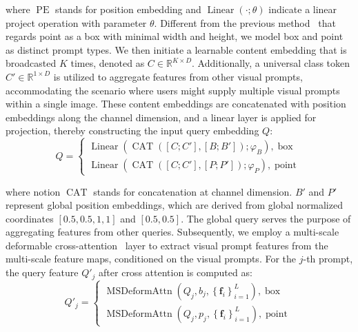 where $\operatorname{PE}$ stands for position embedding and $\operatorname{Linear}(\cdot; \theta)$ indicate a linear project operation with parameter $\theta$. Different from the previous method~\cite{li2023semantic} that regards point as a box with minimal width and height, we model box and point as distinct prompt types. We then initiate a learnable content embedding that is broadcasted $K$ times, denoted as $C \in \mathbb{R}^{K \times D}$. Additionally, a universal class token $C' \in \mathbb{R}^{1 \times D}$ is utilized to aggregate features from other visual prompts, accommodating the scenario where users might supply multiple visual prompts within a single image. These content embeddings are concatenated with position embeddings along the channel dimension, and a linear layer is applied for projection, thereby constructing the input query embedding $Q$:
\begin{equation}
Q = \begin{cases} 
\operatorname{Linear}\left(\operatorname{CAT}\left(\left[C; C'\right], \left[B; B'\right]\right); \varphi_B\right) , \operatorname{box} \\
\operatorname{Linear}\left(\operatorname{CAT}\left(\left[C; C'\right], \left[P; P'\right]\right); \varphi_P\right), \operatorname{ point}
\end{cases} 
\end{equation}

where notion $\operatorname{CAT}$ stands for concatenation at channel dimension. $B'$ and $P'$ represent global position embeddings, which are derived from global normalized coordinates $[0.5, 0.5, 1, 1]$ and $[0.5, 0.5]$. The global query serves the purpose of aggregating features from other queries. Subsequently, we employ a multi-scale deformable cross-attention~\cite{zhu2020deformable} layer to extract visual prompt features from the multi-scale feature maps, conditioned on the visual prompts. For the $j$-th prompt, the query feature ${Q'_j}$ after cross attention is computed as:
\begin{equation}
{Q'_j} = \begin{cases} 
\operatorname{MSDeformAttn}(Q_j, b_j, \left\{\boldsymbol{f}_i\right\}_{i=1}^L) , \operatorname{box} \\
\operatorname{MSDeformAttn}(Q_j, p_j, \left\{\boldsymbol{f}_i\right\}_{i=1}^L) , \operatorname{point}
\end{cases} 
\end{equation}

